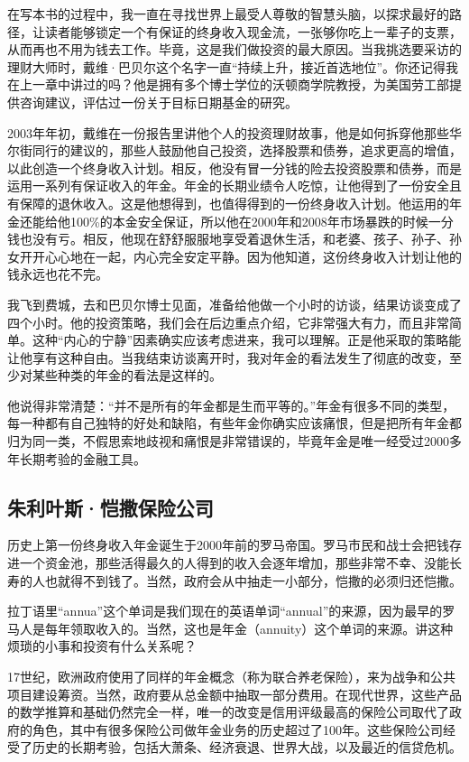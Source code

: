 在写本书的过程中，我一直在寻找世界上最受人尊敬的智慧头脑，以探求最好的路径，让读者能够锁定一个有保证的终身收入现金流，一张够你吃上一辈子的支票，从而再也不用为钱去工作。毕竟，这是我们做投资的最大原因。当我挑选要采访的理财大师时，戴维·巴贝尔这个名字一直“持续上升，接近首选地位”。你还记得我在上一章中讲过的吗？他是拥有多个博士学位的沃顿商学院教授，为美国劳工部提供咨询建议，评估过一份关于目标日期基金的研究。

2003年年初，戴维在一份报告里讲他个人的投资理财故事，他是如何拆穿他那些华尔街同行的建议的，那些人鼓励他自己投资，选择股票和债券，追求更高的增值，以此创造一个终身收入计划。相反，他没有冒一分钱的险去投资股票和债券，而是运用一系列有保证收入的年金。年金的长期业绩令人吃惊，让他得到了一份安全且有保障的退休收入。这是他想得到，也值得得到的一份终身收入计划。他运用的年金还能给他100\%的本金安全保证，所以他在2000年和2008年市场暴跌的时候一分钱也没有亏。相反，他现在舒舒服服地享受着退休生活，和老婆、孩子、孙子、孙女开开心心地在一起，内心完全安定平静。因为他知道，这份终身收入计划让他的钱永远也花不完。

我飞到费城，去和巴贝尔博士见面，准备给他做一个小时的访谈，结果访谈变成了四个小时。他的投资策略，我们会在后边重点介绍，它非常强大有力，而且非常简单。这种“内心的宁静”因素确实应该考虑进来，我可以理解。正是他采取的策略能让他享有这种自由。当我结束访谈离开时，我对年金的看法发生了彻底的改变，至少对某些种类的年金的看法是这样的。

他说得非常清楚：“并不是所有的年金都是生而平等的。”年金有很多不同的类型，每一种都有自己独特的好处和缺陷，有些年金你确实应该痛恨，但是把所有年金都归为同一类，不假思索地歧视和痛恨是非常错误的，毕竟年金是唯一经受过2000多年长期考验的金融工具。

\subsection{朱利叶斯·恺撒保险公司}

历史上第一份终身收入年金诞生于2000年前的罗马帝国。罗马市民和战士会把钱存进一个资金池，那些活得最久的人得到的收入会逐年增加，那些非常不幸、没能长寿的人也就得不到钱了。当然，政府会从中抽走一小部分，恺撒的必须归还恺撒。

拉丁语里“annua”这个单词是我们现在的英语单词“annual”的来源，因为最早的罗马人是每年领取收入的。当然，这也是年金（annuity）这个单词的来源。讲这种烦琐的小事和投资有什么关系呢？

17世纪，欧洲政府使用了同样的年金概念（称为联合养老保险），来为战争和公共项目建设筹资。当然，政府要从总金额中抽取一部分费用。在现代世界，这些产品的数学推算和基础仍然完全一样，唯一的改变是信用评级最高的保险公司取代了政府的角色，其中有很多保险公司做年金业务的历史超过了100年。这些保险公司经受了历史的长期考验，包括大萧条、经济衰退、世界大战，以及最近的信贷危机。

